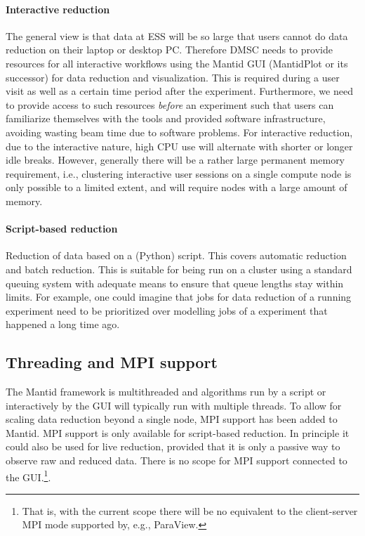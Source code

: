 \documentclass[a4paper,english,numbers=noenddot,bibliography=totoc,chapterprefix=on,DIV=12]{scrartcl}
\newcommand{\mantid}{Mantid\xspace}
\begin{document}
\paragraph{Interactive reduction} 
The general view is that data at ESS will be so large that users cannot do data reduction on their laptop or desktop PC. Therefore DMSC needs to provide resources for all interactive workflows using the \mantid GUI (MantidPlot or its successor) for data reduction and visualization.
This is required during a user visit as well as a certain time period after the experiment.
Furthermore, we need to provide access to such resources \emph{before} an experiment such that users can familiarize themselves with the tools and provided software infrastructure, avoiding wasting beam time due to software problems.
For interactive reduction, due to the interactive nature, high CPU use will alternate with shorter or longer idle breaks.
However, generally there will be a rather large permanent memory requirement, i.e., clustering interactive user sessions on a single compute node is only possible to a limited extent, and will require nodes with a large amount of memory.

\paragraph{Script-based reduction}
Reduction of data based on a (Python) script.
This covers automatic reduction and batch reduction.
This is suitable for being run on a cluster using a standard queuing system with adequate means to ensure that queue lengths stay within limits.
For example, one could imagine that jobs for data reduction of a running experiment need to be prioritized over modelling jobs of a experiment that happened a long time ago.


\subsection{Threading and MPI support}
\label{sec:threading-and-mpi-support}

The \mantid framework is multithreaded and algorithms run by a script or interactively by the GUI will typically run with multiple threads.
To allow for scaling data reduction beyond a single node, MPI support has been added to \mantid.
MPI support is only available for script-based reduction.
In principle it could also be used for live reduction, provided that it is only a passive way to observe raw and reduced data.
There is no scope for MPI support connected to the GUI.\footnote{That is, with the current scope there will be no equivalent to the client-server MPI mode supported by, e.g., ParaView.}.
\end{document}
